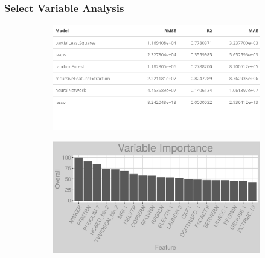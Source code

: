 \subsubsection{Select Variable Analysis}
\label{appendix:electricity:sva}
\begin{figure}[h]
\centering
\begin{subfigure}{0.8\textwidth}
\centering
\includegraphics[width=.99\textwidth, height=0.35\textheight]{Images/electricity_fe_summary.png}
\end{subfigure}
\begin{subfigure}{1\textwidth}
\centering
\includegraphics[width=.99\textwidth, height=0.35\textheight]{Images/electricity_all_vars.png}
\end{subfigure}
\end{figure}
\FloatBarrier
\newpage

